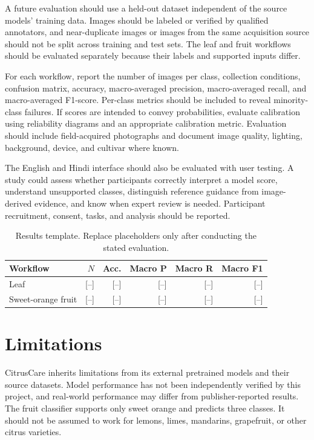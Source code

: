 \documentclass[conference]{IEEEtran}
\begin{document}
A future evaluation should use a held-out dataset independent of the source models' training data. Images should be labeled or verified by qualified annotators, and near-duplicate images or images from the same acquisition source should not be split across training and test sets. The leaf and fruit workflows should be evaluated separately because their labels and supported inputs differ.

For each workflow, report the number of images per class, collection conditions, confusion matrix, accuracy, macro-averaged precision, macro-averaged recall, and macro-averaged F1-score. Per-class metrics should be included to reveal minority-class failures. If scores are intended to convey probabilities, evaluate calibration using reliability diagrams and an appropriate calibration metric. Evaluation should include field-acquired photographs and document image quality, lighting, background, device, and cultivar where known.

The English and Hindi interface should also be evaluated with user testing. A study could assess whether participants correctly interpret a model score, understand unsupported classes, distinguish reference guidance from image-derived evidence, and know when expert review is needed. Participant recruitment, consent, tasks, and analysis should be reported.

\begin{table}[!t]
\caption{Results template. Replace placeholders only after conducting the stated evaluation.}
\label{tab:results}
\centering
\footnotesize
\begin{tabular}{lrrrrr}
\toprule
Workflow & $N$ & Acc. & Macro P & Macro R & Macro F1\\
\midrule
Leaf & [--] & [--] & [--] & [--] & [--]\\
Sweet-orange fruit & [--] & [--] & [--] & [--] & [--]\\
\bottomrule
\end{tabular}
\end{table}

\section{Limitations}
CitrusCare inherits limitations from its external pretrained models and their source datasets. Model performance has not been independently verified by this project, and real-world performance may differ from publisher-reported results. The fruit classifier supports only sweet orange and predicts three classes. It should not be assumed to work for lemons, limes, mandarins, grapefruit, or other citrus varieties.
\end{document}
